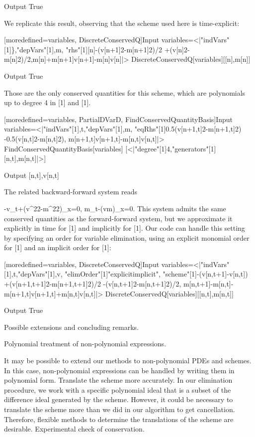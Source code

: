 \documentclass{article}
\begin{document}
{		{Output}
  True

	
We replicate this result, observing that the scheme used here is time-explicit:
	
	
		[moredefined={variables, DiscreteConservedQ}]{Input}
  variables=<|"indVars"[1]\},"depVars"[1],m,
  "rhs"[1][n]-({v[n+1]}{2}-{m[n+1]}{2})/2
  +({v[n]}{2}-{m[n]}{2})/2,m[n]+m[n+1]v[n+1]-m[n]v[n]|>
  DiscreteConservedQ[variables][[n],m[n]]
  

		{Output}
  True

	
	Those are the only conserved quantities for this scheme, which are polynomials up to degree 4 in [1] and [1].
	
	
		[moredefined={variables, PartialDVarD, FindConservedQuantityBasis}]{Input}
  variables=<|"indVars"[1],t,"depVars"[1],m,
  "eqRhs"[1]0.5({v[n+1,t]}{2}-{m[n+1,t]}{2})
  -0.5({v[n,t]}{2}-{m[n,t]}{2}),
  m[n+1,t]v[n+1,t]-m[n,t]v[n,t]|>
  FindConservedQuantityBasis[variables]
  [<|"degree"[1]4,"generators"[1][n,t],m[n,t]|>]
  

		{Output}
  [n,t],v[n,t]

	


	The related backward-forward system reads
	
		-v_t+({v^2}{2}-{m^2}{2})_x=0,
		m_t-(vm)_x=0.
	This system admits the same conserved quantities as the forward-forward system, but we approximate it explicitly in time for [1] and implicitly for [1].
	Our code can handle this setting by specifying an order for variable elimination, using an explicit monomial order for [1] and an implicit order for [1]:
	
	
		[moredefined={variables, DiscreteConservedQ}]{Input}
  variables=<|"indVars"[1],t,"depVars"[1],v,
  "elimOrder"[1]"explicitimplicit",
  "scheme"[1]-(v[n,t+1]-v[n,t])
  +({v[n+1,t+1]}{2}-{m[n+1,t+1]}{2})/2
  -({v[n,t+1]}{2}-{m[n,t+1]}{2})/2,
  m[n,t+1]-m[n,t]-m[n+1,t]v[n+1,t]+m[n,t]v[n,t]|>
  DiscreteConservedQ[variables][[n,t],m[n,t]]
  

		{Output}
  True

	

Possible extensions and concluding remarks.


 Polynomial treatment of non-polynomial expressions.


It may be possible to extend our methods to non-polynomial PDEs and schemes. In this case, non-polynomial expressions can be handled by writing them in polynomial form.
{Translate the scheme more accurately.}
In our elimination procedure, we work with a specific polynomial ideal that is a subset of the difference ideal generated by the scheme. However, it could be necessary to translate the scheme more than we did in our algorithm to get cancellation. Therefore, flexible methods to determine the translations of the scheme are desirable.
Experimental check of conservation.


}
\end{document}
